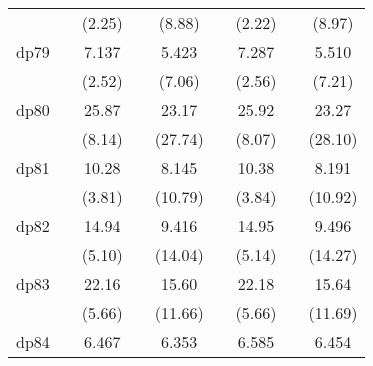 {\begin{tabular}{l*{8}{c}}
            &                     &      (2.25)         &                     &      (8.88)         &                     &      (2.22)         &                     &      (8.97)         \\
[1em]
dp79        &                     &       7.137\sym{*}  &                     &       5.423\sym{***}&                     &       7.287\sym{*}  &                     &       5.510\sym{***}\\
            &                     &      (2.52)         &                     &      (7.06)         &                     &      (2.56)         &                     &      (7.21)         \\
[1em]
dp80        &                     &       25.87\sym{***}&                     &       23.17\sym{***}&                     &       25.92\sym{***}&                     &       23.27\sym{***}\\
            &                     &      (8.14)         &                     &     (27.74)         &                     &      (8.07)         &                     &     (28.10)         \\
[1em]
dp81        &                     &       10.28\sym{***}&                     &       8.145\sym{***}&                     &       10.38\sym{***}&                     &       8.191\sym{***}\\
            &                     &      (3.81)         &                     &     (10.79)         &                     &      (3.84)         &                     &     (10.92)         \\
[1em]
dp82        &                     &       14.94\sym{***}&                     &       9.416\sym{***}&                     &       14.95\sym{***}&                     &       9.496\sym{***}\\
            &                     &      (5.10)         &                     &     (14.04)         &                     &      (5.14)         &                     &     (14.27)         \\
[1em]
dp83        &                     &       22.16\sym{***}&                     &       15.60\sym{***}&                     &       22.18\sym{***}&                     &       15.64\sym{***}\\
            &                     &      (5.66)         &                     &     (11.66)         &                     &      (5.66)         &                     &     (11.69)         \\
[1em]
dp84        &                     &       6.467\sym{**} &                     &       6.353\sym{***}&                     &       6.585\sym{**} &                     &       6.454\sym{***}\\

\end{tabular}}
